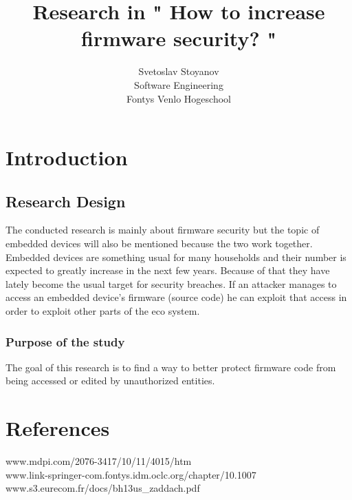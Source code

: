 \documentclass[]{report}
\begin{document}
\title{Research in " How to increase firmware security? " }
\author{Svetoslav Stoyanov \\
	Software Engineering \\
	Fontys Venlo Hogeschool}

\maketitle

\tableofcontents
\chapter{Introduction}
\section{Research Design}
The conducted research is mainly about firmware security but the topic of embedded devices will also be mentioned because the two work together.
Embedded devices are something usual for many households and their number is expected to greatly increase in the next few years. Because of that they have lately become the usual target for security breaches. If an attacker manages to access an embedded device's firmware (source code) he can exploit that access in order to exploit other parts of the eco system.

\subsection{Purpose of the study} 
The goal of this research is to find a way to better protect firmware code from being accessed or edited by unauthorized entities.
\chapter{References}

www.mdpi.com/2076-3417/10/11/4015/htm 
\\
www.link-springer-com.fontys.idm.oclc.org/chapter/10.1007%
\\
www.s3.eurecom.fr/docs/bh13us\_zaddach.pdf
\end{document}
